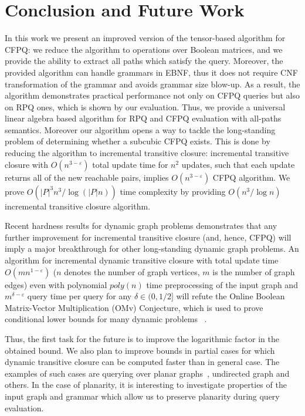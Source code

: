 \section{Conclusion and Future Work}

In this work we present an improved version of the tensor-based algorithm for CFPQ: we reduce the algorithm to operations over Boolean matrices, and we provide the ability to extract all paths which satisfy the query.
Moreover, the provided algorithm can handle grammars in EBNF, thus it does not require CNF transformation of the grammar and avoids grammar size blow-up.
As a result, the algorithm demonstrates practical performance not only on CFPQ queries but also on RPQ ones, which is shown by our evaluation.
Thus, we provide a universal linear algebra based algorithm for RPQ and CFPQ evaluation with all-paths semantics.
Moreover our algorithm opens a way to tackle the long-standing problem of determining whether a subcubic CFPQ exists.
This is done by reducing the algorithm to incremental transitive closure: incremental transitive closure with $O(n^{3-\varepsilon})$ total update time for $n^2$ updates, such that each update returns all of the new reachable pairs, implies $O(n^{3-\varepsilon})$ CFPQ algorithm.
We prove $O({|P|}^3n^3/\log (|P|n))$ time complexity by providing $O(n^3/\log{n})$ incremental transitive closure algorithm.


Recent hardness results for dynamic graph problems demonstrates that any further improvement for incremental transitive closure (and, hence, CFPQ) will imply a major breakthrough for other long-standing dynamic graph problems. An algorithm for incremental dynamic transitive closure with total update time $O(mn^{1-\varepsilon})$ ($n$ denotes the number of graph vertices, $m$ is the number of graph edges) even with polynomial $poly(n)$ time preprocessing of the input graph and $m^{\delta - \varepsilon}$ query time per query for any $\delta \in (0, 1/2]$ will refute the Online Boolean Matrix-Vector Multiplication (OMv) Conjecture, which is used to prove conditional lower bounds for many dynamic problems ~\citep{8948597, 10.1145/2746539.2746609}.


Thus, the first task for the future is to improve the logarithmic factor in the obtained bound.
We also plan to improve bounds in partial cases for which dynamic transitive closure can be computed faster than in general case.
The examples of such cases are querying over planar graphs~\citep{10.1007/3-540-57273-2_72}, undirected graph and others.
In the case of planarity, it is interesting to investigate properties of the input graph and grammar which allow us to preserve planarity during query evaluation.

